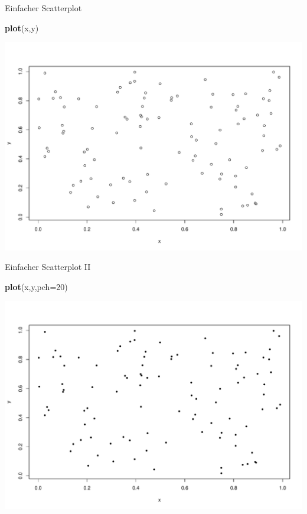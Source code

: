 \documentclass[ignorenonframetext,]{beamer}
\newenvironment{Shaded}{}{}
\newcommand{\KeywordTok}[1]{\textcolor[rgb]{0.00,0.44,0.13}{\textbf{{#1}}}}
\newcommand{\DataTypeTok}[1]{\textcolor[rgb]{0.56,0.13,0.00}{{#1}}}
\newcommand{\DecValTok}[1]{\textcolor[rgb]{0.25,0.63,0.44}{{#1}}}
\newcommand{\NormalTok}[1]{{#1}}
\begin{document}
\begin{frame}[fragile]{Einfacher Scatterplot}

\begin{Shaded}
\begin{Highlighting}[]
\KeywordTok{plot}\NormalTok{(x,y)}
\end{Highlighting}
\end{Shaded}

\includegraphics{R_intern_files/figure-beamer/unnamed-chunk-161-1.pdf}

\end{frame}

\begin{frame}[fragile]{Einfacher Scatterplot II}

\begin{Shaded}
\begin{Highlighting}[]
\KeywordTok{plot}\NormalTok{(x,y,}\DataTypeTok{pch=}\DecValTok{20}\NormalTok{)}
\end{Highlighting}
\end{Shaded}

\includegraphics{R_intern_files/figure-beamer/unnamed-chunk-162-1.pdf}

\end{frame}
\end{document}

